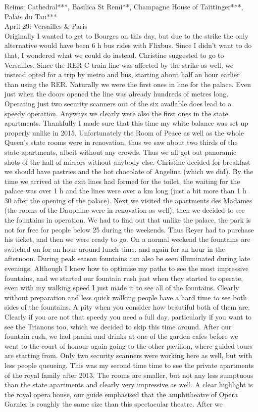 Reims: Cathedral***, Basilica St Remi**, Champagne House of Taittinger***, Palais du Tau***\\

April 29: Versailles \& Paris\\
Originally I wanted to get to Bourges on this day, but due to the strike the only alternative would have been 6 h bus rides with Flixbus. Since I didn't want to do that, I wondered what we could do instead. Christine suggested to go to Versailles. Since the RER C train line was affected by the strike as well, we instead opted for a trip by metro and bus, starting about half an hour earlier than using the RER. Naturally we were the first ones in line for the palace. Even just when the doors opened the line was already hundreds of metres long. Operating just two security scanners out of the six available does lead to a speedy operation. Anyways we clearly were also the first ones in the state apartments. Thankfully I made sure that this time my white balance was set up properly unlike in 2015. Unfortunately the Room of Peace as well as the whole Queen's state rooms were in renovation, thus we saw about two thirds of the state apartments, albeit without any crowds. Thus we all got out panoramic shots of the hall of mirrors without anybody else. Christine decided for breakfast we should have pastries and the hot chocolate of Angelina (which we did). By the time we arrived at the exit lines had formed for the toilet, the waiting for the palace was over 1 h and the lines were over a km long (just a bit more than 1 h 30 after the opening of the palace). Next we visited the apartments des Madames (the rooms of the Dauphine were in renovation as well), then we decided to see the fountains in operation. We had to find out that unlike the palace, the park is not for free for people below 25 during the weekends. Thus Reyer had to purchase his ticket, and then we were ready to go. On a normal weekend the fountains are switched on for an hour around lunch time, and again for an hour in the afternoon. During peak season fountains can also be seen illuminated during late evenings. Although I knew how to optimise my paths to see the most impressive fountains, and we started our fountain rush just when they started to operate, even with my walking speed I just made it to see all of the fountains. Clearly without preparation and less quick walking people have a hard time to see both sides of the fountains. A pity when you consider how beautiful both of them are. Clearly if you are not that speedy you need a full day, particularly if you want to see the Trianons too, which we decided to skip this time around. After our fountain rush, we had panini and drinks at one of the garden cafes before we went to the court of honour again going to the other pavilion, where guided tours are starting from. Only two security scanners were working here as well, but with less people queueing. This was my second time time to see the private apartments of the royal family after 2013. The rooms are smaller, but not any less sumptuous than the state apartments and clearly very impressive as well. A clear highlight is the royal opera house, our guide emphasised that the amphitheatre of Opera Garnier is roughly the same size than this spectacular theatre. After we 